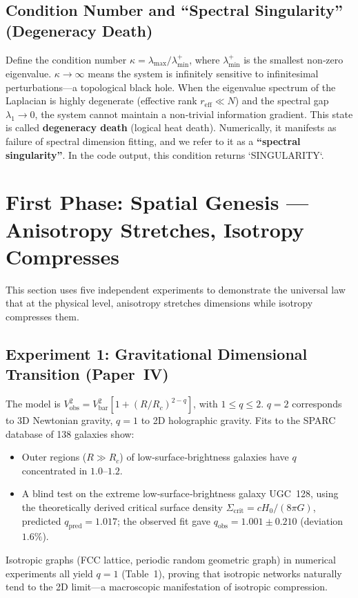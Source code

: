 \documentclass[12pt,a4paper]{article}
\begin{document}
\subsection{Condition Number and ``Spectral Singularity'' (Degeneracy Death)}

Define the condition number $\kappa=\lambda_{\max}/\lambda_{\min}^+$, where $\lambda_{\min}^+$ is the smallest non‑zero eigenvalue. $\kappa\to\infty$ means the system is infinitely sensitive to infinitesimal perturbations—a topological black hole. When the eigenvalue spectrum of the Laplacian is highly degenerate (effective rank $r_{\text{eff}}\ll N$) and the spectral gap $\lambda_1\to0$, the system cannot maintain a non‑trivial information gradient. This state is called \textbf{degeneracy death} (logical heat death). Numerically, it manifests as failure of spectral dimension fitting, and we refer to it as a \textbf{``spectral singularity''}. In the code output, this condition returns `SINGULARITY`.

\section{First Phase: Spatial Genesis — Anisotropy Stretches, Isotropy Compresses}

This section uses five independent experiments to demonstrate the universal law that at the physical level, anisotropy stretches dimensions while isotropy compresses them.

\subsection{Experiment 1: Gravitational Dimensional Transition (Paper~IV)}

The model is $V_{\text{obs}}^2 = V_{\text{bar}}^2[1+(R/R_c)^{2-q}]$, with $1\le q\le2$. $q=2$ corresponds to 3D Newtonian gravity, $q=1$ to 2D holographic gravity. Fits to the SPARC database of 138 galaxies show:
\begin{itemize}
    \item Outer regions ($R\gg R_c$) of low‑surface‑brightness galaxies have $q$ concentrated in $1.0$–$1.2$.
    \item A blind test on the extreme low‑surface‑brightness galaxy UGC~128, using the theoretically derived critical surface density $\Sigma_{\text{crit}}=cH_0/(8\pi G)$, predicted $q_{\text{pred}}=1.017$; the observed fit gave $q_{\text{obs}}=1.001\pm0.210$ (deviation $1.6\%$).
\end{itemize}
Isotropic graphs (FCC lattice, periodic random geometric graph) in numerical experiments all yield $q=1$ (Table~1), proving that isotropic networks naturally tend to the 2D limit—a macroscopic manifestation of isotropic compression.
\end{document}
